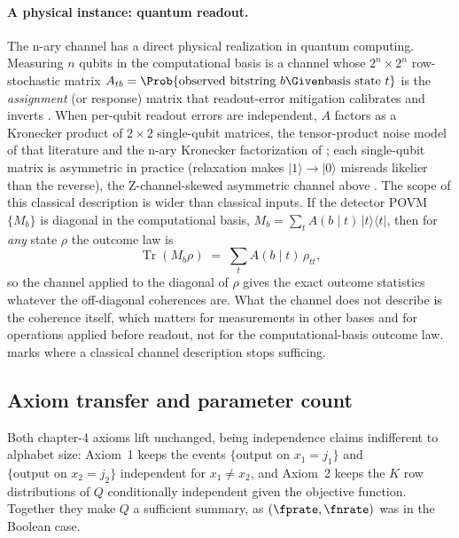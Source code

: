 \paragraph{A physical instance: quantum readout.}
The n-ary channel has a direct physical realization in quantum computing.
Measuring $n$ qubits in the computational basis is a
channel whose $2^n \times 2^n$ row-stochastic matrix $A_{tb} =
\Prob{\text{observed bitstring } b \Given \text{basis state } t}$ is the
\emph{assignment} (or response) matrix that readout-error mitigation calibrates
and inverts \parencite{bravyi-et-al-2021,nation-et-al-2021,maciejewski-zimboras-oszmaniec-2020}.
When per-qubit readout errors are independent, $A$ factors as a Kronecker
product of $2 \times 2$ single-qubit matrices, the tensor-product noise model of
that literature and the n-ary Kronecker factorization of
; each single-qubit matrix is asymmetric in practice
(relaxation makes $|1\rangle \to |0\rangle$ misreads likelier than the
reverse), the Z-channel-skewed asymmetric channel above
\parencite{smith-et-al-2021}. The scope of this classical description is wider
than classical inputs. If the detector POVM $\{M_b\}$ is
diagonal in the computational basis, $M_b = \sum_t A(b \mid t)\,
|t\rangle\langle t|$, then for \emph{any} state $\rho$
the outcome law is
\[
  \operatorname{Tr}(M_b \rho) \;=\; \sum_t A(b \mid t)\, \rho_{tt},
\]
so the channel applied to the diagonal of $\rho$ gives the exact outcome
statistics whatever the off-diagonal coherences are. What the channel does not
describe is the coherence itself, which matters for measurements in other bases
and for operations applied before readout, not for the computational-basis
outcome law.  marks where a classical channel
description stops sufficing.

\subsection*{Axiom transfer and parameter count}

Both chapter-4 axioms lift unchanged, being independence claims indifferent to
alphabet size: Axiom~1 keeps the events $\{\text{output on } x_1 = j_1\}$ and
$\{\text{output on } x_2 = j_2\}$ independent for $x_1 \neq x_2$, and Axiom~2
keeps the $K$ row distributions of $Q$ conditionally independent given the
objective function. Together they make $Q$ a sufficient summary, as
$(\fprate, \fnrate)$ was in the Boolean case.

